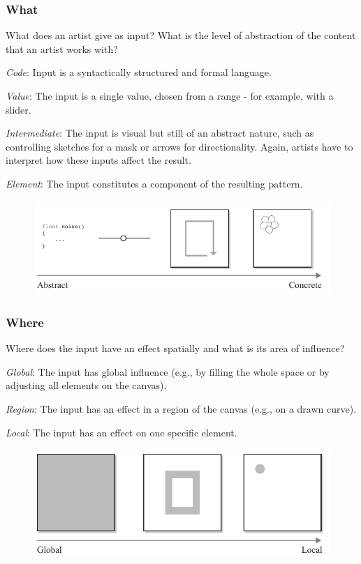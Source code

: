 \subsubsection{What}

What does an artist give as input? What is the level of abstraction of the content that an artist works with?

\textit{Code}: Input is a syntactically structured and formal language.

\textit{Value}: The input is a single value, chosen from a range - for example, with a slider.

\textit{Intermediate}: The input is visual but still of an abstract nature, such as controlling sketches for a mask or arrows for directionality. Again, artists have to interpret how these inputs affect the result.

\textit{Element}: The input constitutes a component of the resulting pattern.

\begin{figure}[H]
    \centering
        \includegraphics[width=\controlParamsFigWidth\linewidth]{figures/control_paradigms/what.pdf}
\end{figure}



\subsubsection{Where}

Where does the input have an effect spatially and what is its area of influence?

\textit{Global}: The input has global influence (e.g., by filling the whole space or by adjusting all elements on the canvas).

\textit{Region}: The input has an effect in a region of the canvas (e.g., on a drawn curve).

\textit{Local}: The input has an effect on one specific element.

\begin{figure}[H]
    \centering
        \includegraphics[width=\controlParamsFigWidth\linewidth]{figures/control_paradigms/where.pdf}
\end{figure}


